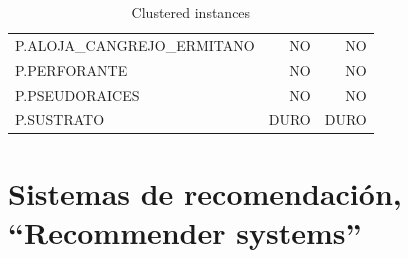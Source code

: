 \documentclass[es]{ifirak}
\begin{document}
\begin{landscape}
\begin{table}[htbp]
\begin{tabular}{|l|r|r|}
		P.ALOJA\_CANGREJO\_ERMITANO                                     &                               NO &                               NO \\
		P.PERFORANTE                                                    &                               NO &                               NO \\
		P.PSEUDORAICES                                                  &                               NO &                               NO \\
		P.SUSTRATO                                                      &                             DURO &                             DURO
	\end{tabular}
\caption{Clustered instances}\label{table}
\end{table}

\end{landscape}


\section{Sistemas de recomendación, “Recommender systems”}
\end{document}
